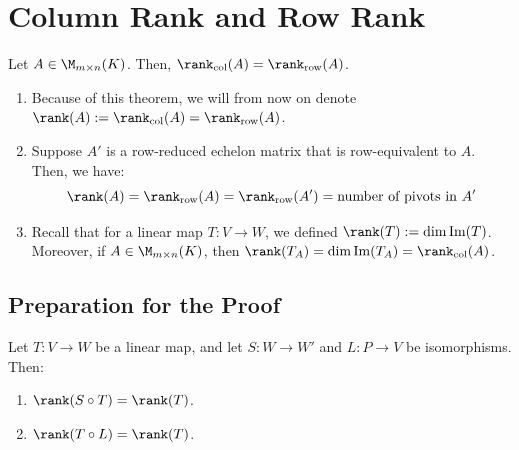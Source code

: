 \section{Column Rank and Row Rank}

\begin{theorem}
\label{thm:rank_row_column_equality}
Let $A \in \M_{m \times n}(K)$. Then, $\rank_{\text{col}}(A) = \rank_{\text{row}}(A)$.
\end{theorem}

\begin{remark}
\begin{enumerate}
    \item Because of this theorem, we will from now on denote $\rank(A) := \rank_{\text{col}}(A) = \rank_{\text{row}}(A)$.
    \item Suppose $A'$ is a row-reduced echelon matrix that is row-equivalent to $A$. Then, we have:
    \begin{equation*}
        \rank(A) = \rank_{\text{row}}(A) = \rank_{\text{row}}(A') = \text{number of pivots in } A'
    \end{equation*}
    \item Recall that for a linear map $T: V \to W$, we defined $\rank(T) := \dim \operatorname{Im}(T)$. Moreover, if $A \in \M_{m \times n}(K)$, then $\rank(T_A) = \dim \operatorname{Im}(T_A) = \rank_{\text{col}}(A)$.
\end{enumerate}
\end{remark}

\subsection{Preparation for the Proof}

\begin{lemma}
\label{lemma:rank_invariance_isomorphisms}
Let $T: V \to W$ be a linear map, and let $S: W \to W'$ and $L: P \to V$ be isomorphisms. Then:
\begin{enumerate}
    \item $\rank(S \circ T) = \rank(T)$.
    \item $\rank(T \circ L) = \rank(T)$.
\end{enumerate}
\end{lemma}

